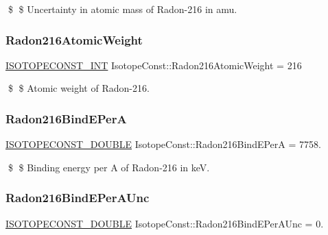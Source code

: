 \$ \$ Uncertainty in atomic mass of Radon-\/216 in amu. \mbox{\label{group___isotope_const-_radon-_rn216_gaddf01e377fbe6852af4ffac81e8eb781}} 
\subsubsection{\texorpdfstring{Radon216\+Atomic\+Weight}{Radon216AtomicWeight}}
{\footnotesize\ttfamily \mbox{\hyperlink{group___isotope_const-_macros_ga5f18360b3e99483a35c32d789e62621c}{I\+S\+O\+T\+O\+P\+E\+C\+O\+N\+S\+T\+\_\+\+I\+NT}} Isotope\+Const\+::\+Radon216\+Atomic\+Weight = 216}

\$ \$ Atomic weight of Radon-\/216. \mbox{\label{group___isotope_const-_radon-_rn216_ga6135c8fd506162bb43a6cfb64284e24d}} 
\subsubsection{\texorpdfstring{Radon216\+Bind\+E\+PerA}{Radon216BindEPerA}}
{\footnotesize\ttfamily \mbox{\hyperlink{group___isotope_const-_macros_ga8f45a7272ce02c0b4c65c44636ed719a}{I\+S\+O\+T\+O\+P\+E\+C\+O\+N\+S\+T\+\_\+\+D\+O\+U\+B\+LE}} Isotope\+Const\+::\+Radon216\+Bind\+E\+PerA = 7758.}

\$ \$ Binding energy per A of Radon-\/216 in keV. \mbox{\label{group___isotope_const-_radon-_rn216_ga788580b940636de177b311eba8cb0fcd}} 
\subsubsection{\texorpdfstring{Radon216\+Bind\+E\+Per\+A\+Unc}{Radon216BindEPerAUnc}}
{\footnotesize\ttfamily \mbox{\hyperlink{group___isotope_const-_macros_ga8f45a7272ce02c0b4c65c44636ed719a}{I\+S\+O\+T\+O\+P\+E\+C\+O\+N\+S\+T\+\_\+\+D\+O\+U\+B\+LE}} Isotope\+Const\+::\+Radon216\+Bind\+E\+Per\+A\+Unc = 0.}

